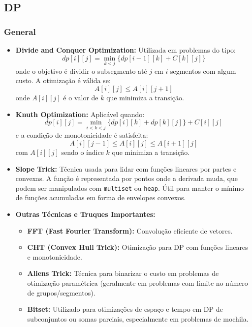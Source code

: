 \subsection{DP}

\subsubsection{General}

\begin{small}
\begin{itemize}
    \item \textbf{Divide and Conquer Optimization:} Utilizada em problemas do tipo:
    \[
    dp[i][j] = \min_{k < j} \{ dp[i - 1][k] + C[k][j] \}
    \]
    onde o objetivo é dividir o subsegmento até $j$ em $i$ segmentos com algum custo. A otimização é válida se:
    \[
    A[i][j] \leq A[i][j+1]
    \]
    onde $A[i][j]$ é o valor de $k$ que minimiza a transição.

    \item \textbf{Knuth Optimization:} Aplicável quando:
    \[
    dp[i][j] = \min_{i < k < j} \{ dp[i][k] + dp[k][j] \} + C[i][j]
    \]
    e a condição de monotonicidade é satisfeita:
    \[
    A[i][j-1] \leq A[i][j] \leq A[i+1][j]
    \]
    com $A[i][j]$ sendo o índice $k$ que minimiza a transição.

    \item \textbf{Slope Trick:} Técnica usada para lidar com funções lineares por partes e convexas. A função é representada por pontos onde a derivada muda, que podem ser manipulados com \texttt{multiset} ou \texttt{heap}. Útil para manter o mínimo de funções acumuladas em forma de envelopes convexos.

    \item \textbf{Outras Técnicas e Truques Importantes:}
    \begin{itemize}
        \item \textbf{FFT (Fast Fourier Transform):} Convolução eficiente de vetores.
        \item \textbf{CHT (Convex Hull Trick):} Otimização para DP com funções lineares e monotonicidade.
        \item \textbf{Aliens Trick:} Técnica para binarizar o custo em problemas de otimização paramétrica (geralmente em problemas com limite no número de grupos/segmentos).
        \item \textbf{Bitset:} Utilizado para otimizações de espaço e tempo em DP de subconjuntos ou somas parciais, especialmente em problemas de mochila.
    \end{itemize}
\end{itemize}
\end{small}

